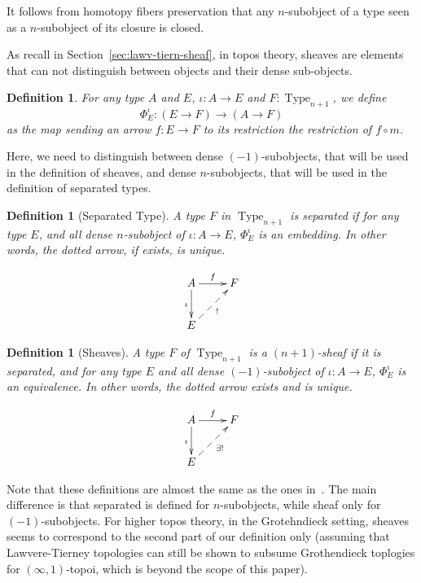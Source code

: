 \documentclass[conference]{IEEEtran}
\newtheorem{defi}[thm]{Definition}
\DeclareMathOperator{\Type}{Type}
\begin{document}
It follows from homotopy fibers preservation that any $n$-subobject of
a type seen as a $n$-subobject of its closure is closed.

As recall in Section~\ref{sec:lawv-tiern-sheaf}, in topos theory,
sheaves are elements that can not distinguish between objects and
their dense sub-objects. 

\begin{defi}
  For any type $A$ and $E$, $\iota : A \to E$ and $F:\Type_{n+1}$, we define
    $$
    \Phi_E^\iota : (E \to F) \to (A \to F) 
    $$
    as the map sending an
    arrow $f:E\to F$ to its restriction the restriction of $f \circ m$.
\end{defi}

Here, we need to distinguish between
dense $(-1)$-subobjects, that will be used in the definition of
sheaves, and dense $n$-subobjects, that will be used in the definition
of separated types. 

\begin{defi}[Separated Type]
  A type $F$ in $\Type_{n+1}$ is {\em separated} if for any type $E$, and
  all dense $n$-subobject of $\iota : A \to E$,
  $\Phi_E^\iota$ is an embedding. In other words, the dotted arrow,
  if exists, is unique.

  $$\xymatrix{
    A \ar[r]^f \ar[d]_{\iota} & F \\
    E \ar@{-->}[ru]_{!}&
  }$$
\end{defi}

\begin{defi}[Sheaves]
  A type $F$ of $\Type_{n+1}$ is a {\em $(n+1)$-sheaf} if it is
  separated, and for any type $E$ and all dense $(-1)$-subobject of
  $\iota : A \to E$, $\Phi_E^\iota$ is an
  equivalence. In other words, the dotted arrow exists and is unique.

  $$\xymatrix{
    A \ar[r]^f \ar[d]_{\iota} & F \\
    E \ar@{-->}[ru]_{\exists !}&
  }$$
\end{defi}

Note that these definitions are almost the same as the ones
in~\cite{maclanemoerdijk}. The main difference is that {separated}
is defined for $n$-subobjects, while {sheaf} only for
$(-1)$-subobjects.
%
For higher topos theory, in the Grotehndieck setting, sheaves seems
to correspond to the second part of our definition only (assuming that
Lawvere-Tierney topologies can still be shown to subsume Grothendieck
toplogies for $(\infty,1)$-topoi, which is beyond the scope of this paper).
%
\end{document}
